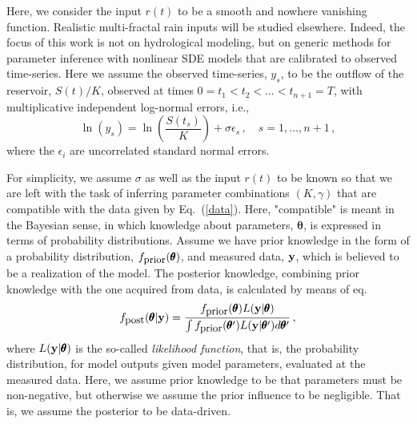 \documentclass[12pt,a4paper,final]{iopart}
\newcommand{\bt}{\pmb\theta}
\newcommand{\vc}[1]{{\bf #1 }}
\begin{document}
Here, we consider the input $r(t)$ to be a smooth and nowhere vanishing function. Realistic multi-fractal rain inputs \cite{tessier_1996} will be studied elsewhere.
Indeed, the focus of this work is not on hydrological modeling, but on generic methods for parameter inference with nonlinear SDE models that are calibrated to observed time-series.
Here we assume the observed time-series, $y_s$, to be the outflow of the reservoir, $S(t)/K$, observed at times $0=t_1<t_2<\dots < t_{n+1}=T$, with multiplicative independent log-normal errors, i.e.,
\begin{equation}\label{data}
  \ln \left( y_s \right)
  =
  \ln \left( \frac{S(t_s)}{K} \right)
  +
  \sigma\epsilon_s\,,\quad s=1,\dots,n+1\,,
\end{equation}
where the $\epsilon_i$ are uncorrelated standard normal errors.

For simplicity, we assume $\sigma$ as well as the input $r(t)$ to be known so that we are left with the task of inferring parameter combinations $(K,\gamma)$ that are compatible with the data given by Eq.~(\ref{data}).
Here, "compatible" is meant in the Bayesian sense, in which knowledge about parameters, $\bt$, is expressed in terms of probability distributions.
Assume we have prior knowledge in the form of a probability distribution, $f_{\mbox{\small prior}}(\bt)$, and measured data, $\vc y$, which is believed to be a realization of the model.
The posterior knowledge, combining prior knowledge with the one acquired from data, is calculated by means of eq.
\begin{equation}\label{Bayes}
  f_{\mbox{\small post}}(\bt|\vc y)
  =
  \frac{f_{\mbox{\small prior}}(\bt)L(\vc y|\bt)}
  {\int f_{\mbox{\small prior}}(\bt')L(\vc y|\bt')d\bt'}\,,
\end{equation}
where $L(\vc y|\bt)$ is the so-called {\em likelihood function}, that is, the probability distribution, for model outputs given model parameters, evaluated at the measured data.
Here, we assume prior knowledge to be that parameters must be non-negative, but otherwise we assume the prior influence to be negligible. That is, we assume the posterior to be data-driven.
\end{document}
